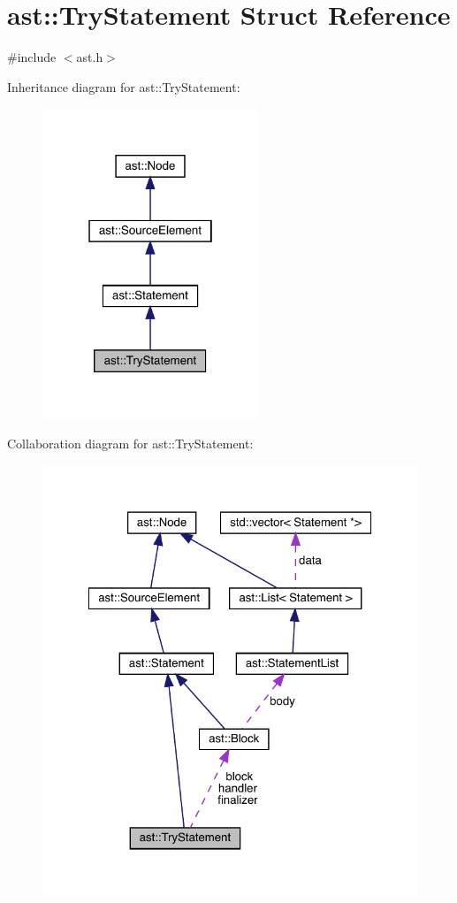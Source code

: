 \hypertarget{structast_1_1_try_statement}{}\section{ast\+:\+:Try\+Statement Struct Reference}
\label{structast_1_1_try_statement}


{\ttfamily \#include $<$ast.\+h$>$}



Inheritance diagram for ast\+:\+:Try\+Statement\+:
\nopagebreak
\begin{figure}[H]
\begin{center}
\leavevmode
\includegraphics[width=183pt]{structast_1_1_try_statement__inherit__graph}
\end{center}
\end{figure}


Collaboration diagram for ast\+:\+:Try\+Statement\+:
\nopagebreak
\begin{figure}[H]
\begin{center}
\leavevmode
\includegraphics[width=322pt]{structast_1_1_try_statement__coll__graph}
\end{center}
\end{figure}
